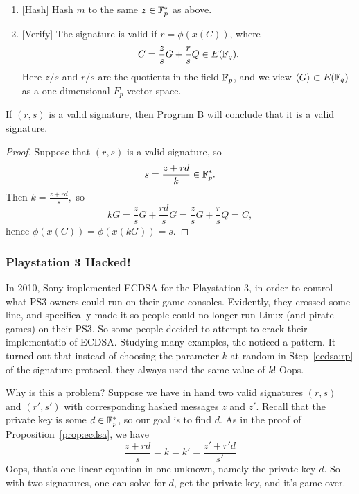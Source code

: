\documentclass{book}
\begin{document}
\begin{enumerate}
\item{}[Hash] Hash $m$ to the same $z\in \mathbb{F}_p^*$ as above.
\item{}[Verify] The signature is valid if $r=\phi(x(C))$,
where
$$C = \frac{z}{s} G + \frac{r}{s} Q \in E(\mathbb{F}_q).$$
Here $z/s$ and $r/s$ are the quotients in the field $\mathbb{F}_p$, and
we view $\langle G\rangle \subset E(\mathbb{F}_q)$
as a one-dimensional $F_p$-vector space.
\end{enumerate}


\begin{proposition}\label{prop:ecdsa}
If $(r,s)$ is a valid signature, then Program B will conclude that
it is a valid signature.
\end{proposition}
\begin{proof}
Suppose that $(r,s)$ is a valid signature, so
$$s = \frac{z+rd}{k} \in \mathbb{F}_p^*.$$
Then
$
k = \frac{z+rd}{s},
$
so
$$
k G = \frac{z}{s} G + \frac{rd}{s} G
  = \frac{z}{s} G + \frac{r}{s} Q = C,
$$
hence $\phi(x(C)) = \phi(x(kG)) = s$.

\end{proof}

\subsubsection{Playstation 3 Hacked!}

In 2010, Sony implemented ECDSA for the Playstation 3, in order to control
what PS3 owners could run on their game consoles.  Evidently, they crossed
some line, and specifically made it so people could no longer run Linux (and
pirate games) on their PS3.  So some people decided to attempt to crack
their implementatio of ECDSA.  Studying many examples, the noticed a pattern.
It turned out that instead of choosing the parameter $k$
at random in Step~\ref{ecdsa:rp} of the signature protocol, they
always used the same value of $k$!  Oops.

Why is this a problem?  Suppose we have in hand two valid
signatures $(r,s)$ and $(r',s')$ with corresponding hashed
messages $z$ and $z'$.  Recall that the private
key is some $d\in\mathbb{F}_p^*$, so our goal is to find $d$.
As in the proof of Proposition~\ref{prop:ecdsa}, we have
\begin{equation}\label{eqn:ecdsacrack}
\frac{z+rd}{s} = k = k' = \frac{z' + r'd}{s'}
\end{equation}
Oops, that's one linear equation in one unknown, namely the private
key $d$.  So with two signatures, one can solve for $d$, get
the private key, and it's game over.
\end{document}
